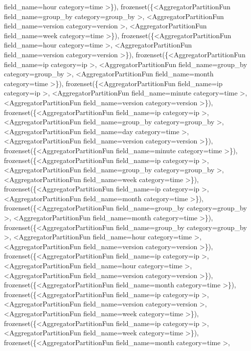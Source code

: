 \documentclass[letterpaper,10pt,english]{sphinxmanual}
\begin{document}
\begin{fulllineitems}
\begin{fulllineitems}
field\_name=hour category=time \textgreater{}\}), frozenset(\{\textless{}AggregatorPartitionFun field\_name=group\_by category=group\_by \textgreater{}, \textless{}AggregatorPartitionFun field\_name=version category=version \textgreater{}, \textless{}AggregatorPartitionFun field\_name=week category=time \textgreater{}\}), frozenset(\{\textless{}AggregatorPartitionFun field\_name=hour category=time \textgreater{}, \textless{}AggregatorPartitionFun field\_name=version category=version \textgreater{}\}), frozenset(\{\textless{}AggregatorPartitionFun field\_name=ip category=ip \textgreater{}, \textless{}AggregatorPartitionFun field\_name=group\_by category=group\_by \textgreater{}, \textless{}AggregatorPartitionFun field\_name=month category=time \textgreater{}\}), frozenset(\{\textless{}AggregatorPartitionFun field\_name=ip category=ip \textgreater{}, \textless{}AggregatorPartitionFun field\_name=minute category=time \textgreater{}, \textless{}AggregatorPartitionFun field\_name=version category=version \textgreater{}\}), frozenset(\{\textless{}AggregatorPartitionFun field\_name=ip category=ip \textgreater{}, \textless{}AggregatorPartitionFun field\_name=group\_by category=group\_by \textgreater{}, \textless{}AggregatorPartitionFun field\_name=day category=time \textgreater{}, \textless{}AggregatorPartitionFun field\_name=version category=version \textgreater{}\}), frozenset(\{\textless{}AggregatorPartitionFun field\_name=minute category=time \textgreater{}\}), frozenset(\{\textless{}AggregatorPartitionFun field\_name=ip category=ip \textgreater{}, \textless{}AggregatorPartitionFun field\_name=group\_by category=group\_by \textgreater{}, \textless{}AggregatorPartitionFun field\_name=week category=time \textgreater{}\}), frozenset(\{\textless{}AggregatorPartitionFun field\_name=ip category=ip \textgreater{}, \textless{}AggregatorPartitionFun field\_name=month category=time \textgreater{}\}), frozenset(\{\textless{}AggregatorPartitionFun field\_name=group\_by category=group\_by \textgreater{}, \textless{}AggregatorPartitionFun field\_name=month category=time \textgreater{}\}), frozenset(\{\textless{}AggregatorPartitionFun field\_name=group\_by category=group\_by \textgreater{}, \textless{}AggregatorPartitionFun field\_name=hour category=time \textgreater{}, \textless{}AggregatorPartitionFun field\_name=version category=version \textgreater{}\}), frozenset(\{\textless{}AggregatorPartitionFun field\_name=ip category=ip \textgreater{}, \textless{}AggregatorPartitionFun field\_name=hour category=time \textgreater{}, \textless{}AggregatorPartitionFun field\_name=version category=version \textgreater{}\}), frozenset(\{\textless{}AggregatorPartitionFun field\_name=month category=time \textgreater{}\}), frozenset(\{\textless{}AggregatorPartitionFun field\_name=ip category=ip \textgreater{}, \textless{}AggregatorPartitionFun field\_name=version category=version \textgreater{}, \textless{}AggregatorPartitionFun field\_name=week category=time \textgreater{}\}), frozenset(\{\textless{}AggregatorPartitionFun field\_name=ip category=ip \textgreater{}, \textless{}AggregatorPartitionFun field\_name=week category=time \textgreater{}\}), frozenset(\{\textless{}AggregatorPartitionFun field\_name=month category=time \textgreater{}, 
\end{fulllineitems}
\end{fulllineitems}
\end{document}
